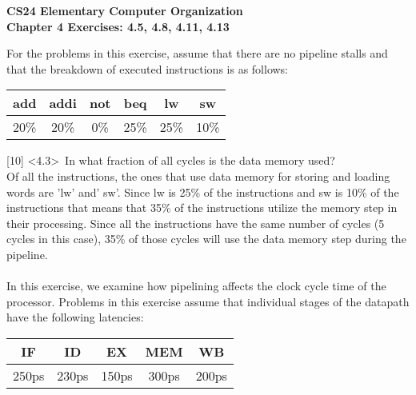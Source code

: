 \documentclass[12pt]{article}
\begin{document}
	\begin{center}
		\textbf{CS24 Elementary Computer Organization} \\
		\textbf{Chapter 4 Exercises: 4.5, 4.8, 4.11, 4.13} \vspace{0.5cm}
	\end{center}
	
	\noindent {} 
	For the problems in this exercise, assume that there are no pipeline stalls and that the breakdown of executed instructions is as follows: \\
	
	\begin{center}
		
		\begin{tabular}{ |c|c|c|c|c|c| } 
			\hline
			add & addi & not & beq & lw & sw  \\
			\hline
			20\% & 20\% & 0\% & 25\% & 25\% & 10\% \\
			\hline
			
		\end{tabular}
		
	\end{center}
	
	\noindent {} 
	[10] \textless4.3\textgreater \ In what fraction of all cycles is the data memory used? \\
	
		
	\vspace{0.2cm}
	Of all the instructions, the ones that use data memory for storing and loading words are 'lw' and' sw'. Since lw is 25\% of the instructions and sw is 10\% of the instructions that means that 35\% of the instructions utilize the memory step in their processing. Since all the instructions have the same number of cycles (5 cycles in this case), 35\% of those cycles will use the data memory step during the pipeline.  \\
	\vspace{0.8cm} \\
		
	
	
	
	\noindent {} In this exercise, we examine how pipelining affects the clock cycle time of the processor. Problems in this exercise assume that individual stages of the datapath have the following latencies: \\
	\begin{center}
		
		\begin{tabular}{ |c|c|c|c|c| } 
			\hline
			IF & ID & EX & MEM & WB  \\
			\hline
			250ps & 230ps & 150ps & 300ps & 200ps \\
			\hline
			
		\end{tabular}
		
	\end{center}
	
\end{document}

